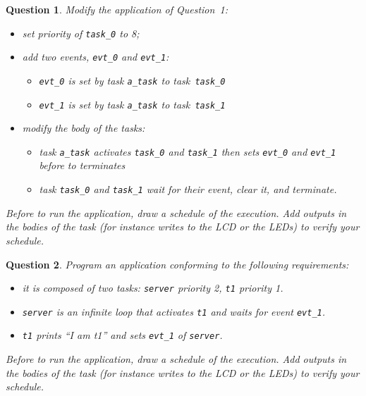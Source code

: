 \documentclass[11pt]{report}
\newtheorem{ex}{Question}
\begin{document}
\begin{ex}
     Modify the application of Question~1:
\begin{itemize}
    \item set priority of \texttt{task_0} to 8;
    \item add two events, \texttt{evt\_0} and \texttt{evt\_1}:
        \begin{itemize}
            \item \texttt{evt_0} is set by task \texttt{a\_task} to task \texttt{task\_0}
            \item \texttt{evt_1} is set by task \texttt{a\_task} to task \texttt{task\_1}
        \end{itemize}
    \item modify the body of the tasks:
        \begin{itemize}
            \item task \texttt{a\_task} activates \texttt{task\_0} and \texttt{task\_1} then sets \texttt{evt\_0} and \texttt{evt\_1} before to terminates
            \item task \texttt{task\_0} and \texttt{task\_1} wait for their event, clear it, and terminate.
        \end{itemize}
\end{itemize}

Before to run the application, draw a schedule of the execution. Add outputs in the bodies of the task (for instance writes to the LCD or the LEDs) to verify your schedule.
\end{ex}

\begin{ex}
Program an application conforming to the following requirements:

\begin{itemize}
    \item it is composed of two tasks: \texttt{server} priority 2, \texttt{t1} priority 1.
    \item \texttt{server} is an infinite loop that activates \texttt{t1} and waits for event \texttt{evt_1}.
    \item \texttt{t1} prints ``I am t1'' and sets \texttt{evt_1} of \texttt{server}.
\end{itemize}

Before to run the application, draw a schedule of the execution. Add outputs in the bodies of the task (for instance writes to the LCD or the LEDs) to verify your schedule.
\end{ex}
\end{document}
